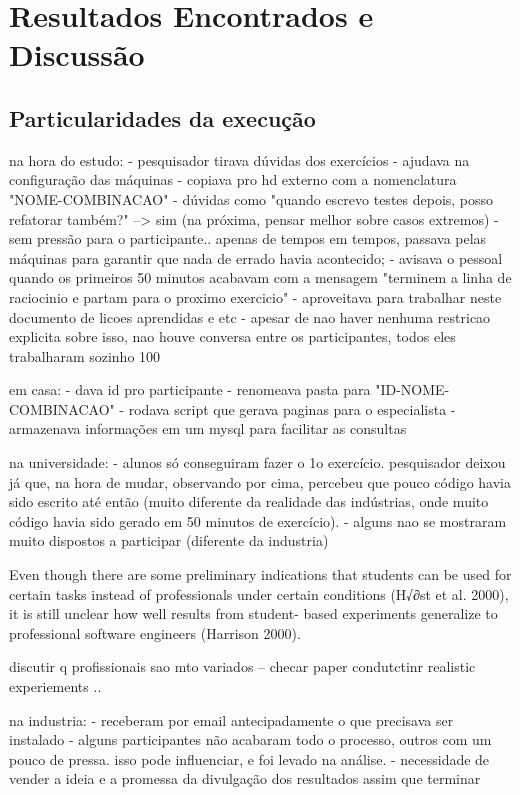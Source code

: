 \chapter{Resultados Encontrados e Discussão}
\label{cap:discussao}

\section{Particularidades da execução}

na hora do estudo:
- pesquisador tirava dúvidas dos exercícios
- ajudava na configuração das máquinas
- copiava pro hd externo com a nomenclatura "NOME-COMBINACAO"
- dúvidas como "quando escrevo testes depois, posso refatorar também?" --> sim (na próxima, pensar melhor sobre casos extremos)
- sem pressão para o participante.. apenas de tempos em tempos, passava pelas máquinas para garantir que nada de errado havia acontecido;
- avisava o pessoal quando os primeiros 50 minutos acabavam com a mensagem "terminem a linha de raciocinio e partam para o proximo exercicio"
- aproveitava para trabalhar neste documento de licoes aprendidas e etc
- apesar de nao haver nenhuma restricao explicita sobre isso, nao houve conversa entre os participantes, todos eles trabalharam sozinho 100%

em casa:
- dava id pro participante
- renomeava pasta para "ID-NOME-COMBINACAO"
- rodava script que gerava paginas para o especialista
- armazenava informações em um mysql para facilitar as consultas

na universidade:
- alunos só conseguiram fazer o 1o exercício. pesquisador deixou já que, na hora de mudar, observando por cima,
percebeu que pouco código havia sido escrito até então (muito diferente da realidade das indústrias, onde
muito código havia sido gerado em 50 minutos de exercício).
- alguns nao se mostraram muito dispostos a participar (diferente da industria)


Even though there are some preliminary indications that students can be used for certain tasks instead of professionals under certain conditions (H√∂st et al. 2000), it is still unclear how well results from student- based experiments generalize to professional software engineers (Harrison 2000).

discutir q profissionais sao mto variados -- checar paper condutctinr realistic experiements ..


na industria:
- receberam por email antecipadamente o que precisava ser instalado
- alguns participantes não acabaram todo o processo, outros com um pouco de pressa. isso pode influenciar, e foi
levado na análise.
- necessidade de vender a ideia e a promessa da divulgação dos resultados assim que terminar


